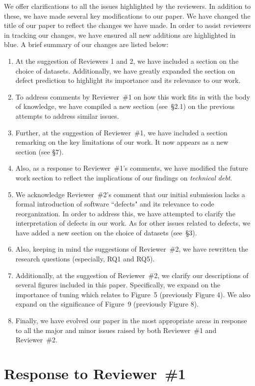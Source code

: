 \documentclass[twocolumn,5p]{elsarticle}
\newcommand{\be}{\begin{enumerate}}
\newcommand{\ee}{\end{enumerate}}
\newcommand{\tion}[1]{\S#1}
\newcommand{\fig}[1]{Figure~#1}
\theoremstyle{break}
\begin{document}
We offer clarifications to all the issues highlighted by the reviewers. In 
addition to these, we have made several key modifications to our paper. We 
have changed the title of our paper to reflect the changes we have made. In 
order to assist reviewers in tracking our changes, we have ensured all 
new additions are {\color{steel} highlighted in blue}. 
A brief summary of our changes are listed below:
\be
\item At the suggestion of Reviewers 1 and 2, we have included a section on 
the choice of datasets. Additionally, we have greatly expanded the section 
on defect prediction to highlight its importance and its relevance to our 
work.
\item To address comments by Reviewer~\#1 on how this work fits in with the 
body of knowledge, we have compiled a new section (see~\tion{2.1}) on the 
previous attempts to address similar issues. 
\item Further, at the suggestion of Reviewer~\#1, we have included a 
section remarking on the key limitations of our work. It now appears as a 
new section (see \tion{7}).
\item Also, as a response to Reviewer~\#1's comments, we have modified the 
future work section to reflect the implications of our findings on 
\textit{technical debt}. 
\item We acknowledge Reviewer~\#2's comment that our initial submission 
lacks a formal introduction of software ``defects" and its relevance to 
code reorganization. In order to address this, we have attempted to 
clarify 
the interpretation of defects in our work. As for other issues related to 
defects, we have added a new section on the choice of datasets 
(see~\tion{3}).
\item Also, keeping in mind the suggestions of Reviewer~\#2, we have 
rewritten the research questions (especially, RQ1 and RQ5).
\item Additionally, at the suggestion of Reviewer~\#2, we clarify our 
descriptions of several figures included in this paper. Specifically, we 
expand on the importance of tuning which relates to \fig{5} (previously 
Figure 4). We also expand on the significance of \fig{9} 
(previously 
Figure 8).
\item Finally, we have evolved our paper in the most appropriate areas in 
response to all the major and minor issues raised by both Reviewer~\#1 and 
Reviewer~\#2.
\ee

\section*{Response to Reviewer~\#1}
\end{document}
